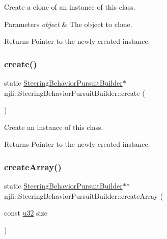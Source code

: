 Create a clone of an instance of this class.


\begin{DoxyParams}{Parameters}
{\em object} & The object to clone.\\
\hline
\end{DoxyParams}
\begin{DoxyReturn}{Returns}
Pointer to the newly created instance. 
\end{DoxyReturn}
\mbox{\label{classnjli_1_1_steering_behavior_pursuit_builder_a1205f423c04365cb699013f9aad38e13}} 
\subsubsection{\texorpdfstring{create()}{create()}}
{\footnotesize\ttfamily static \mbox{\hyperlink{classnjli_1_1_steering_behavior_pursuit_builder}{Steering\+Behavior\+Pursuit\+Builder}}$\ast$ njli\+::\+Steering\+Behavior\+Pursuit\+Builder\+::create (\begin{DoxyParamCaption}{ }\end{DoxyParamCaption})\hspace{0.3cm}{\ttfamily [static]}}

Create an instance of this class.

\begin{DoxyReturn}{Returns}
Pointer to the newly created instance. 
\end{DoxyReturn}
\mbox{\label{classnjli_1_1_steering_behavior_pursuit_builder_ad8703df1b50866be041606e627ed9d84}} 
\subsubsection{\texorpdfstring{create\+Array()}{createArray()}}
{\footnotesize\ttfamily static \mbox{\hyperlink{classnjli_1_1_steering_behavior_pursuit_builder}{Steering\+Behavior\+Pursuit\+Builder}}$\ast$$\ast$ njli\+::\+Steering\+Behavior\+Pursuit\+Builder\+::create\+Array (\begin{DoxyParamCaption}\item[{const \mbox{\hyperlink{_util_8h_a10e94b422ef0c20dcdec20d31a1f5049}{u32}}}]{size }\end{DoxyParamCaption})\hspace{0.3cm}{\ttfamily [static]}}

